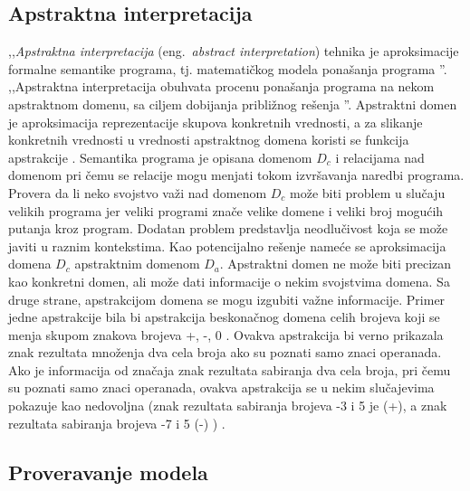 \documentclass[12pt,oneside]{memoir}
\begin{document}
\subsection{Apstraktna interpretacija}
,,\textit{Apstraktna interpretacija} (eng.~\textit{abstract interpretation}) tehnika je aproksimacije formalne semantike programa, tj. matematičkog modela ponašanja programa \cite{mvj}''. ,,Apstraktna interpretacija obuhvata procenu ponašanja programa na nekom apstraktnom domenu, sa ciljem dobijanja približnog rešenja \cite{AutoTechnFormSofVer}''. Apstraktni domen je aproksimacija reprezentacije skupova konkretnih vrednosti, a za slikanje konkretnih vrednosti u vrednosti apstraktnog domena koristi se funkcija apstrakcije \cite{AutoTechnFormSofVer}. Semantika programa je opisana domenom $D_c$ i relacijama nad domenom pri čemu se relacije mogu menjati tokom izvršavanja naredbi programa. Provera da li neko svojstvo važi nad domenom $D_c$ može biti problem u slučaju velikih programa jer veliki programi znače velike domene i veliki broj mogućih putanja kroz program. Dodatan problem predstavlja neodlučivost koja se može javiti u raznim kontekstima. Kao potencijalno rešenje nameće se aproksimacija domena $D_c$ apstraktnim domenom $D_a$. Apstraktni domen ne može biti precizan kao konkretni domen, ali može dati informacije o nekim svojstvima domena. Sa druge strane, apstrakcijom domena se mogu izgubiti važne informacije. Primer jedne apstrakcije bila bi apstrakcija beskonačnog domena celih brojeva koji se menja skupom znakova brojeva {+, -, 0 }. Ovakva apstrakcija bi verno prikazala znak rezultata množenja dva cela broja ako su poznati samo znaci operanada. Ako je informacija od značaja znak rezultata sabiranja dva cela broja, pri čemu su poznati samo znaci operanada, ovakva apstrakcija se u nekim slučajevima pokazuje kao nedovoljna (znak rezultata sabiranja brojeva -3 i 5 je (+), a znak rezultata sabiranja brojeva -7 i 5 (-) ) \cite{mvj}. 


\subsection{Proveravanje modela}
\end{document}
